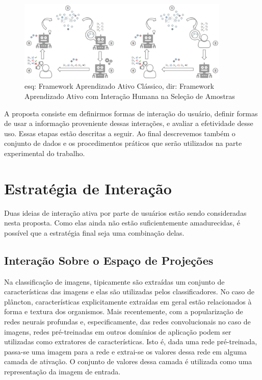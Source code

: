 \begin{figure}
  \centering
  \includegraphics[width=0.9\textwidth]{figures/Frameworks_Active_Learning.png}
  \caption{esq: Framework Aprendizado Ativo Clássico, dir: Framework Aprendizado Ativo com Interação Humana na Seleção de Amostras}
  \label{fig:frameworks_AL}
\end{figure}



A proposta consiste em definirmos formas de interação do usuário, definir formas de usar a informação proveniente dessas interações, e avaliar a efetividade desse uso. Essas etapas estão descritas a seguir. Ao final descrevemos também o conjunto de dados e os procedimentos práticos que serão utilizados na parte experimental do trabalho. 



\section{Estratégia de Interação}
\label{sec:estategia_interacao}

Duas ideias de interação ativa por parte de usuários estão  sendo consideradas nesta proposta. Como elas ainda não estão suficientemente amadurecidas, é possível que a estratégia final seja uma combinação delas.

\subsection{Interação Sobre o Espaço de Projeções}
\label{sec:espaco_projecoes}

Na classificação de imagens, tipicamente são extraídas um conjunto de características das imagens e elas são utilizadas pelos classificadores. No caso de plâncton, características explicitamente extraídas em geral estão relacionados à forma e textura dos organismos. Mais recentemente, com a popularização de redes neurais profundas e, especificamente, das redes convolucionais no caso de imagens, redes pré-treinadas em outros domínios de aplicação podem ser utilizadas como extratores de características. Isto é, dada uma rede pré-treinada, passa-se uma imagem para a rede e extrai-se os valores dessa rede em alguma camada de ativação. O conjunto de valores dessa camada é utilizada como uma representação da imagem de entrada.

